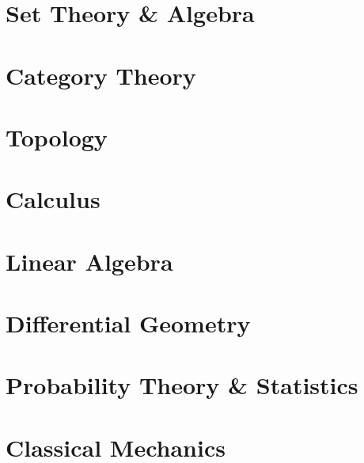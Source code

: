 \documentclass[11pt, a4paper]{report}
\begin{document}
\part{Set Theory \& Algebra}


\part{Category Theory}




\part{Topology}






\part{Calculus}








\part{Linear Algebra}









\part{Differential Geometry}\label{part:diffgeom}














\part{Probability Theory \& Statistics}


%

\part{Classical Mechanics}






\end{document}
